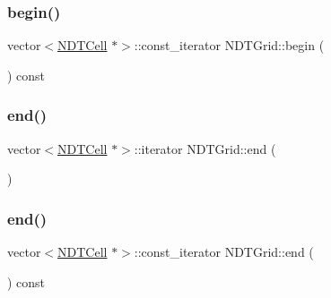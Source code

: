 \mbox{\label{classNDTGrid_a05cbce8015bf6696fa08a9c9a78961d9}} 
\subsubsection{\texorpdfstring{begin()}{begin()}\hspace{0.1cm}{\footnotesize\ttfamily [2/2]}}
{\footnotesize\ttfamily vector$<$\hyperlink{classNDTCell}{N\+D\+T\+Cell} $\ast$$>$\+::const\+\_\+iterator N\+D\+T\+Grid\+::begin (\begin{DoxyParamCaption}{ }\end{DoxyParamCaption}) const\hspace{0.3cm}{\ttfamily [inline]}}

\mbox{\label{classNDTGrid_a788db3557af5ce9bfc6917a8a84aec97}} 
\subsubsection{\texorpdfstring{end()}{end()}\hspace{0.1cm}{\footnotesize\ttfamily [1/2]}}
{\footnotesize\ttfamily vector$<$\hyperlink{classNDTCell}{N\+D\+T\+Cell} $\ast$$>$\+::iterator N\+D\+T\+Grid\+::end (\begin{DoxyParamCaption}{ }\end{DoxyParamCaption})\hspace{0.3cm}{\ttfamily [inline]}}

\mbox{\label{classNDTGrid_a5c83cdcf6fe6ac829c39a05a2a491156}} 
\subsubsection{\texorpdfstring{end()}{end()}\hspace{0.1cm}{\footnotesize\ttfamily [2/2]}}
{\footnotesize\ttfamily vector$<$\hyperlink{classNDTCell}{N\+D\+T\+Cell} $\ast$$>$\+::const\+\_\+iterator N\+D\+T\+Grid\+::end (\begin{DoxyParamCaption}{ }\end{DoxyParamCaption}) const\hspace{0.3cm}{\ttfamily [inline]}}

